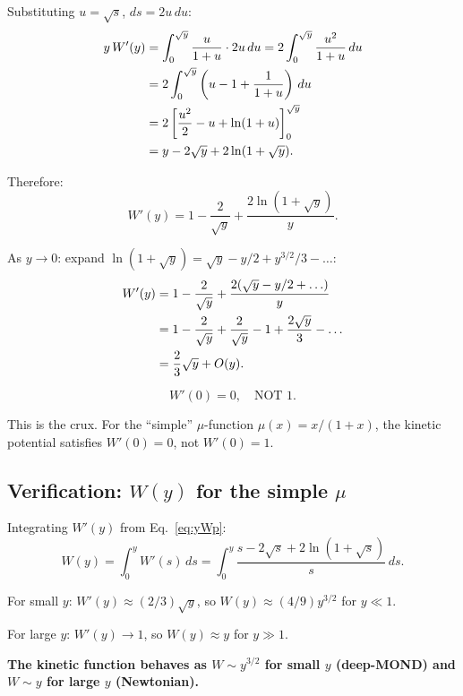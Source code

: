 \documentclass[11pt]{article}
\begin{document}
Substituting $u = \sqrt{s}$, $ds = 2u\,du$:
\begin{align}
y\,W'(y) &= \int_0^{\sqrt{y}} \frac{u}{1+u}\cdot 2u\,du
= 2\int_0^{\sqrt{y}} \frac{u^2}{1+u}\,du \notag\\
&= 2\int_0^{\sqrt{y}} \left(u - 1 + \frac{1}{1+u}\right)\,du \notag\\
&= 2\left[\frac{u^2}{2} - u + \ln(1+u)\right]_0^{\sqrt{y}} \notag\\
&= y - 2\sqrt{y} + 2\ln(1+\sqrt{y}).
\label{eq:yWp}
\end{align}

Therefore:
\begin{equation}
W'(y) = 1 - \frac{2}{\sqrt{y}} + \frac{2\ln(1+\sqrt{y})}{y}.
\label{eq:Wp-exact}
\end{equation}

As $y \to 0$: expand $\ln(1+\sqrt{y}) = \sqrt{y} - y/2 + y^{3/2}/3 - \ldots$:
\begin{align}
W'(y) &= 1 - \frac{2}{\sqrt{y}} + \frac{2(\sqrt{y} - y/2 + \ldots)}{y} \notag\\
&= 1 - \frac{2}{\sqrt{y}} + \frac{2}{\sqrt{y}} - 1 + \frac{2\sqrt{y}}{3} - \ldots \notag\\
&= \frac{2}{3}\sqrt{y} + O(y).
\label{eq:Wp-small-y}
\end{align}

\begin{equation}
\boxed{W'(0) = 0, \quad \text{NOT } 1.}
\label{eq:Wp0-zero}
\end{equation}

This is the crux. For the ``simple'' $\mu$-function $\mu(x) = x/(1+x)$,
the kinetic potential satisfies $W'(0) = 0$, not $W'(0) = 1$.

\subsection{Verification: $W(y)$ for the simple $\mu$}

Integrating $W'(y)$ from Eq.~\eqref{eq:yWp}:
\begin{equation}
W(y) = \int_0^y W'(s)\,ds = \int_0^y \frac{s - 2\sqrt{s} + 2\ln(1+\sqrt{s})}{s}\,ds.
\end{equation}

For small $y$: $W'(y) \approx (2/3)\sqrt{y}$, so
$W(y) \approx (4/9)y^{3/2}$ for $y \ll 1$.

For large $y$: $W'(y) \to 1$, so $W(y) \approx y$ for $y \gg 1$.

\textbf{The kinetic function behaves as $W \sim y^{3/2}$ for small $y$
(deep-MOND) and $W \sim y$ for large $y$ (Newtonian).}
\end{document}
